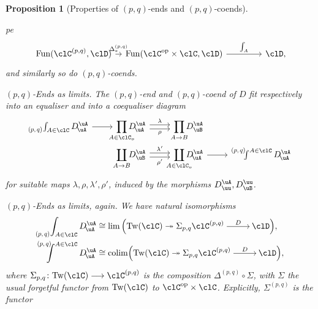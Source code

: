 \documentclass[11pt]{amsart}
\def\Tw#1{\mathrm{Tw}(#1)}
\newcommand*{\Scale}[2][4]{\scalebox{#1}{\ensuremath{#2}}}%
\newcommand{\xloongrightarrow}[1]{%
    \mathrel{%
    \mkern-15.25mu
    \begin{tikzcd}[row sep=3.6em, column sep=2.7em, ampersand replacement=\&]
        {}
        \arrow[r, "#1"] \&
        {}
    \end{tikzcd}
    \mkern-16.25mu
    }
}
\def\colim{\mathrm{colim}}
\newcommand{\pqEnd}[3]{\mathop{\prescript{}{\Scale[.75]{\raisebox{.25em}{$(#1,#2)$}}}{\int_{#3}}}}
\newcommand{\pqCoend}[3]{%
  \mathchoice
    {\mathop{\prescript{\Scale[.75]{\raisebox{-.25em}{$(#1,#2)$}}\kern-.625em}{}{\int^{#3}}}}
    {\mathop{\prescript{\Scale[.75]{\raisebox{-.25em}{$(#1,#2)$}}\kern-.25em}{}{\int^{#3}}}}
    {\mathop{\prescript{\Scale[.75]{\raisebox{-.25em}{$(#1,#2)$}}\kern-.25em}{}{\int^{#3}}}}
    {\mathop{\prescript{\Scale[.75]{\raisebox{-.25em}{$(#1,#2)$}}\kern-.25em}{}{\int^{#3}}}}
  }
\newcommand{\SloganFont}[1]{{\textit{#1. }}}
\newtheorem{proposition}{Proposition}
\def\op{\text{op}}
\begin{document}
\begin{proposition}[Properties of $(p,q)$-ends and $(p,q)$-coends]
\begin{enumtag}{pe}
		\[ 
			\begin{tikzcd}[row sep={11.7em,between origins}, column sep={11.7em,between origins},  ampersand replacement=\&]
				\mathrm{Fun}(\pq{\clC},\clD)
				\arrow[r, "\Delta^{(p,q)}_{*}"]
				\&
				\mathrm{Fun}(\clC^{\op}\times\clC,\clD)
				\arrow[r, "\int_{A}"]
				\&
				\clD\mathrlap{,}
			\end{tikzcd}
		\]
		and similarly so do $(p,q)$-coends.
		\item\label{p-q-ends-as-limits}\SloganFont{$(p,q)$-Ends as limits} The $(p,q)$-end and $(p,q)$-coend of $D$ fit respectively into an equaliser and into a coequaliser diagram
		\begin{gather*}
			\begin{tikzcd}[row sep=0cm,ampersand replacement=\&]
				\pqEnd{p}{q}{A\in\clC}D^{\uA}_{\!\uA}
				\arrow[r,outer sep=-0.1em]
				\&
				\displaystyle\prod_{\mathclap{A\in\clC_o}} D^{\uA}_{\!\uA}
				\arrow[r,shift left =1.0, "\lambda"]
				\arrow[r,shift right=1.0, "\rho"']
				\&
				\displaystyle\prod_{\mathclap{A\to B}} D^{\uA}_{\uB}\\
				\& \displaystyle\coprod_{\mathclap{A\to B}}D^{\uA}_{\uB}
				\arrow[r,shift left =1.0,"\lambda'"]
				\arrow[r,shift right=1.0,"\rho'"']
				\&
				\displaystyle\coprod_{\mathclap{A\in\clC_o}}D^{\uA}_{\!\uA}
				\arrow[r,outer sep=-0.1em]
				\&
				\pqCoend{p}{q}{A\in\clC}D^{\uA}_{\!\uA}
			\end{tikzcd}
		\end{gather*}
		for suitable maps $\lambda,\rho,\lambda',\rho'$, induced by the morphisms $D^{\uA}_{\uu}, D^{\uu}_{\uB}$.
		\item\label{p-q-ends-as-limits-again}\SloganFont{$(p,q)$-Ends as limits, again}We have natural isomorphisms
		\begin{align*}
			\pqEnd{p}{q}{A\in\clC}D^{\uA}_{\!\uA}   & \cong \lim\Big(\Tw{\clC}\twoheadrightarrow {\Sigma_{p,q}}\pq{\clC}\xloongrightarrow{D}\clD\Big),   \\
			\pqCoend{p}{q}{A\in\clC}D^{\uA}_{\!\uA} & \cong \colim\Big(\Tw{\clC}\twoheadrightarrow {\Sigma_{p,q}}\pq{\clC}\xloongrightarrow{D}\clD\Big),
		\end{align*}
		where $\Sigma_{p,q}\colon\Tw{\clC}\longrightarrow\pq{\clC}$ is the composition $\Delta^{(p,q)}\circ\Sigma$, with $\Sigma$ the usual forgetful functor from $\Tw{\clC}$ to $\clC^{\op}\times\clC$. Explicitly, $\Sigma^{(p,q)}$ is the functor

\end{enumtag}
\end{proposition}
\end{document}
